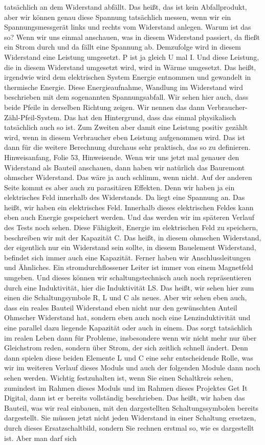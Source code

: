 \begin{frame}
{tatsächlich an dem Widerstand abfällt. Das heißt, das ist kein Abfallprodukt, aber wir können genau diese Spannung tatsächlich messen, wenn wir ein Spannungsmessgerät links und rechts vom Widerstand anlegen. Warum ist das so? Wenn wir uns einmal anschauen, was in diesem Widerstand passiert, da fließt ein Strom durch und da fällt eine Spannung ab. Demzufolge wird in diesem Widerstand eine Leistung umgesetzt. P ist ja gleich U mal I. Und diese Leistung, die in diesem Widerstand umgesetzt wird, wird in Wärme umgesetzt. Das heißt, irgendwie wird dem elektrischen System Energie entnommen und gewandelt in thermische Energie. Diese Energieaufnahme, Wandlung im Widerstand wird beschrieben mit dem sogenannten Spannungsabfall. Wir sehen hier auch, dass beide Pfeile in derselben Richtung zeigen. Wir nennen das dann Verbraucher-Zähl-Pfeil-System. Das hat den Hintergrund, dass das einmal physikalisch tatsächlich auch so ist. Zum Zweiten aber damit eine Leistung positiv gezählt wird, wenn in diesem Verbraucher eben Leistung aufgenommen wird. Das ist dann für die weitere Berechnung durchaus sehr praktisch, das so zu definieren. Hinweisanfang, Folie 53, Hinweisende. Wenn wir uns jetzt mal genauer den Widerstand als Bauteil anschauen, dann haben wir natürlich das Bauremont ohmscher Widerstand. Das wäre ja auch schlimm, wenn nicht. Auf der anderen Seite kommt es aber auch zu parasitären Effekten. Denn wir haben ja ein elektrisches Feld innerhalb des Widerstands. Da liegt eine Spannung an. Das heißt, wir haben ein elektrisches Feld. Innerhalb dieses elektrischen Feldes kann eben auch Energie gespeichert werden. Und das werden wir im späteren Verlauf des Tests noch sehen. Diese Fähigkeit, Energie im elektrischen Feld zu speichern, beschreiben wir mit der Kapazität C. Das heißt, in diesem ohmschen Widerstand, der eigentlich nur ein Widerstand sein sollte, in diesem Bauelement Widerstand, befindet sich immer auch eine Kapazität. Ferner haben wir Anschlussleitungen und Ähnliches. Ein stromdurchflossener Leiter ist immer von einem Magnetfeld umgeben. Und dieses können wir schaltungstechnisch auch noch repräsentieren durch eine Induktivität, hier die Induktivität LS. Das heißt, wir sehen hier zum einen die Schaltungsymbole R, L und C als neues. Aber wir sehen eben auch, dass ein reales Bauteil Widerstand eben nicht nur den gewünschten Anteil Ohmscher Widerstand hat, sondern eben auch noch eine Lenzinduktivität und eine parallel dazu liegende Kapazität oder auch in einem. Das sorgt tatsächlich im realen Leben dann für Probleme, insbesondere wenn wir nicht mehr nur über Gleichstrom reden, sondern über Strom, der sich zeitlich schnell ändert. Denn dann spielen diese beiden Elemente L und C eine sehr entscheidende Rolle, was wir im weiteren Verlauf dieses Moduls und auch der folgenden Module dann noch sehen werden. Wichtig festzuhalten ist, wenn Sie einen Schaltkreis sehen, zumindest im Rahmen dieses Moduls und im Rahmen dieses Projektes Get It Digital, dann ist er bereits vollständig beschrieben. Das heißt, wir haben das Bauteil, was wir real einbauen, mit den dargestellten Schaltungssymbolen bereits dargestellt. Sie müssen jetzt nicht jeden Widerstand in einer Schaltung ersetzen, durch dieses Ersatzschaltbild, sondern Sie rechnen erstmal so, wie es dargestellt ist. Aber man darf sich }
\end{frame}

